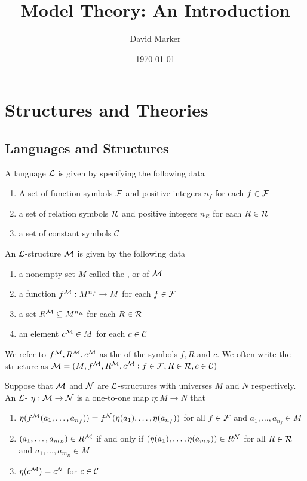 \documentclass[11pt]{article}
\author{David Marker}
\date{\today}
\title{Model Theory: An Introduction}
\begin{document}
\maketitle
\tableofcontents \clearpage\section{Structures and Theories}
\label{sec:org798bc70}
\subsection{Languages and Structures}
\label{sec:org2eb3806}
\begin{definition}[]
A language \(\mathcal{L}\) is given by specifying the following data
\begin{enumerate}
\item A set of function symbols \(\mathcal{F}\) and positive integers \(n_f\) for each
\(f\in\mathcal{F}\)
\item a set of relation symbols \(\mathcal{R}\) and positive integers \(n_R\) for each
\(R\in\mathcal{R}\)
\item a set of constant symbols \(\mathcal{C}\)
\end{enumerate}
\end{definition}

\begin{definition}[]
An \(\mathcal{L}\)-structure \(\mathcal{M}\) is given by the following data
\begin{enumerate}
\item a nonempty set \(M\) called the ,  or 
of \(\mathcal{M}\)
\item a function \(f^{\mathcal{M}}:M^{n_f}\to M\) for each \(f\in\mathcal{F}\)
\item a set \(R^{\mathcal{M}}\subseteq M^{n_R}\) for each \(R\in\mathcal{R}\)
\item an element \(c^{\mathcal{M}}\in M\) for each \(c\in\mathcal{C}\)
\end{enumerate}
\end{definition}

We refer to \(f^{\mathcal{M}},R^{\mathcal{M}},c^{\mathcal{M}}\) as the  of the
symbols \(f,R\) and \(c\). We often write the structure as
\(\mathcal{M}=(M,f^{\mathcal{M}},R^{\mathcal{M}},c^{\mathcal{M}}:f\in\mathcal{F},R\in\mathcal{R},c\in\mathcal{C})\) 

\begin{definition}[]
Suppose that \(\mathcal{M}\) and \(\mathcal{N}\) are \(\mathcal{L}\)-structures with universes \(M\)
and \(N\) respectively. An \(\mathcal{L}\)- \(\eta:\mathcal{M}\to\mathcal{N}\) is a
one-to-one map \(\eta:M\to N\) that
\begin{enumerate}
\item \(\eta(f^{\mathcal{M}}(a_1,\dots,a_{n_f}))=f^{\mathcal{N}}(\eta(a_1),\dots,\eta(a_{n_f}))\)
for all \(f\in\mathcal{F}\) and \(a_1,\dots,a_{n_f}\in M\)
\item \((a_1,\dots,a_{m_R})\in R^{\mathcal{M}}\) if and only if
\((\eta(a_1),\dots,\eta(a_{m_R}))\in R^{\mathcal{N}}\) for all \(R\in\mathcal{R}\) and
\(a_1,\dots,a_{m_R}\in M\)
\item \(\eta(c^{\mathcal{M}})=c^{\mathcal{N}}\) for \(c\in\mathcal{C}\)
\end{enumerate}
\end{definition}
\end{document}
